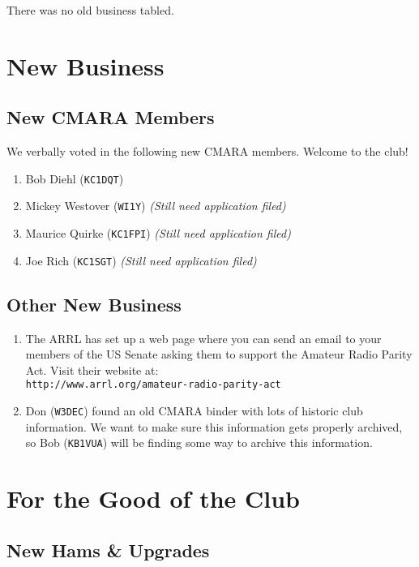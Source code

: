 \documentclass[10pt,letterpaper]{article}
\begin{document}
There was no old business tabled.

\section{New Business}

\subsection{New CMARA Members}

We verbally voted in the following new CMARA members. Welcome to the club!
\begin{enumerate}
\item Bob Diehl (\texttt{KC1DQT})
\item Mickey Westover (\texttt{WI1Y}) \emph{(Still need application filed)}
\item Maurice Quirke (\texttt{KC1FPI}) \emph{(Still need application filed)}
\item Joe Rich (\texttt{KC1SGT}) \emph{(Still need application filed)}
\end{enumerate}

\subsection{Other New Business}

\begin{enumerate}
\item The ARRL has set up a web page where you can send an email to your members of the US Senate asking them to support the Amateur Radio Parity Act. Visit their website at:\\\texttt{http://www.arrl.org/amateur-radio-parity-act}
\item Don (\texttt{W3DEC}) found an old CMARA binder with lots of historic club information. We want to make sure this information gets properly archived, so Bob (\texttt{KB1VUA}) will be finding some way to archive this information.
\end{enumerate}

\section{For the Good of the Club}

\subsection{New Hams \& Upgrades}
\end{document}
